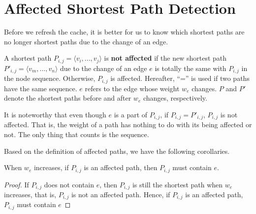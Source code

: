 \section{Affected Shortest Path Detection}
\label{sec:detect-affected}
Before we refresh the cache, it is better for us to know which shortest paths are no longer shortest paths due to the change of an edge.

A shortest path $P_{i,j}=\langle v_i,...,v_j\rangle$ is \textbf{not affected} if the new shortest path $P'_{i,j}=\langle v_m,...,v_n\rangle$ due to the change of an edge $e$ is totally the same with $P_{i,j}$ in the node sequence.
Otherwise, $P_{i,j}$ is affected.
Hereafter, ``='' is used if two paths have the same sequence.
$e$ refers to the edge whose weight $w_e$ changes.
$P$ and $P'$ denote the shortest paths before and after $w_e$ changes, respectively.

It is noteworthy that even though $e$ is a part of $P_{i,j}$, if $P_{i,j}=P'_{i,j}$, $P_{i,j}$ is not affected. That is, the weight of a path has nothing to do with its being affected or not. The only thing that counts is the sequence.

Based on the definition of affected paths, we have the following corollaries.

\begin{corollary}
\label{corollary:weight-increase}
When $w_e$ increases, if $P_{i,j}$ is an affected path, then $P_{i,j}$ must contain $e$.
\end{corollary}

\begin{proof}
If $P_{i,j}$ does not contain $e$, then $P_{i,j}$ is still the shortest path when $w_e$ increases, that is, $P_{i,j}$ is not an affected path. Hence, if $P_{i,j}$ is an affected path, $P_{i,j}$ must contain $e$
\end{proof}

